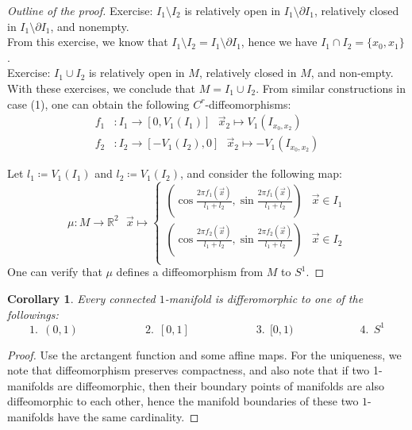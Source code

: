 \documentclass[15pt]{book}
\theoremstyle{break}
\theoremstyle{break}
\newtheorem{corT}[lem]{Corollary}
\newcommand{\R}{\mathbb{R}}
\newcommand{\exercise}{\color{green}Exercise: \color{black}}
\begin{document}
\begin{proof}[Outline of the proof]
\exercise $I_1 \setminus I_2$ is relatively open in $I_1 \setminus \partial I_1$, relatively closed in $I_1 \setminus \partial I_1$, and nonempty.\\

From this exercise, we know that $I_1 \setminus I_2 = I_1 \setminus \partial I_1$, hence we have $I_1 \cap I_2 = \{x_0,x_1\}$. \\

\exercise $I_1 \cup I_2$ is relatively open in $M$, relatively closed in $M$, and non-empty.\\

With these exercises, we conclude that $M = I_1\cup I_2$. From similar constructions in case (1), one can obtain the following $C^r$-diffeomorphisms:
\begin{align*}
f_1&:I_1 \to [0, V_1(I_1)] \ \ \ \vec{x}_2\mapsto V_1(I_{x_0,x_2})\\
f_2&:I_2 \to [-V_1(I_2),0] \ \ \ \vec{x}_2\mapsto -V_1(I_{x_0,x_2})
\end{align*}


Let $l_1\coloneqq  V_1(I_1) $ and $l_2 \coloneqq V_1(I_2)$, and consider the following map:
$$\mu:M \to \R^2 \ \ \ \vec{x} \mapsto \begin{cases}\left(\cos\frac{2\pi f_1(\vec{x})}{l_1+l_2}, \sin\frac{2\pi f_1(\vec{x})}{l_1+l_2}\right) & \vec{x}\in I_1\\
\left(\cos\frac{2\pi f_2(\vec{x})}{l_1+l_2}, \sin\frac{2\pi f_2(\vec{x})}{l_1+l_2}\right) & \vec{x}\in I_2\\
\end{cases}$$
One can verify that $\mu$ defines a diffeomorphism from $M$ to $S^1$.
\end{proof}


\begin{corT}
Every connected $1$-manifold is differomorphic to one of the followings:
$$1.\ \ (0,1) \qquad\qquad\qquad
2.\   \ [0,1] \qquad\qquad\qquad
3.\   \ [0,1)\qquad\qquad\qquad
4.\   \ S^1$$
\end{corT}
\begin{proof}
Use the arctangent function and some affine maps. For the uniqueness, we note that diffeomorphism preserves compactness, and also note that if two 1-manifolds are diffeomorphic, then their boundary points of manifolds are also diffeomorphic to each other, hence the manifold boundaries of these two $1$-manifolds have the same cardinality. 
\end{proof}
\end{document}
